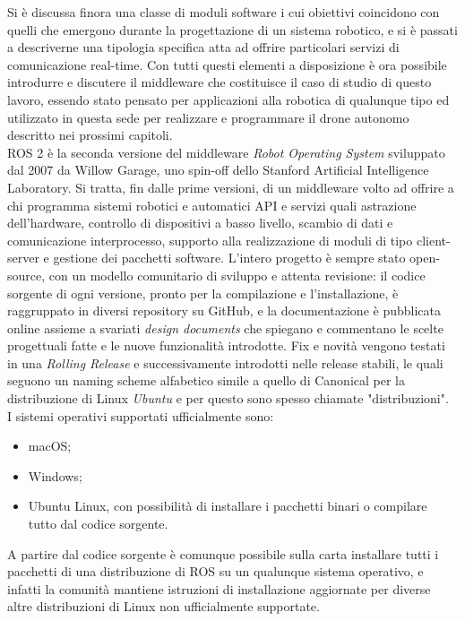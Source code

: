 \indent Si è discussa finora una classe di moduli software i cui obiettivi coincidono con quelli che emergono durante la progettazione di un sistema robotico, e si è passati a descriverne una tipologia specifica atta ad offrire particolari servizi di comunicazione real-time. Con tutti questi elementi a disposizione è ora possibile introdurre e discutere il middleware che costituisce il caso di studio di questo lavoro, essendo stato pensato per applicazioni alla robotica di qualunque tipo ed utilizzato in questa sede per realizzare e programmare il drone autonomo descritto nei prossimi capitoli.\\
ROS 2 è la seconda versione del middleware \emph{Robot Operating System} sviluppato dal 2007 da Willow Garage, uno spin-off dello Stanford Artificial Intelligence Laboratory. Si tratta, fin dalle prime versioni, di un middleware volto ad offrire a chi programma sistemi robotici e automatici API e servizi quali astrazione dell’hardware, controllo di dispositivi a basso livello, scambio di dati e comunicazione interprocesso, supporto alla realizzazione di moduli di tipo client-server e gestione dei pacchetti software. L'intero progetto è sempre stato open-source, con un modello comunitario di sviluppo e attenta revisione: il codice sorgente di ogni versione, pronto per la compilazione e l'installazione, è raggruppato in diversi repository su GitHub, e la documentazione è pubblicata online assieme a svariati \emph{design documents} che spiegano e commentano le scelte progettuali fatte e le nuove funzionalità introdotte. Fix e novità vengono testati in una \emph{Rolling Release} e successivamente introdotti nelle release stabili, le quali seguono un naming scheme alfabetico simile a quello di Canonical per la distribuzione di Linux \emph{Ubuntu} e per questo sono spesso chiamate "distribuzioni".\\
I sistemi operativi supportati ufficialmente sono:
\begin{itemize}
    \item macOS;
    \item Windows;
    \item Ubuntu Linux, con possibilità di installare i pacchetti binari o compilare tutto dal codice sorgente.
\end{itemize}
A partire dal codice sorgente è comunque possibile sulla carta installare tutti i pacchetti di una distribuzione di ROS su un qualunque sistema operativo, e infatti la comunità mantiene istruzioni di installazione aggiornate per diverse altre distribuzioni di Linux non ufficialmente supportate.\\
